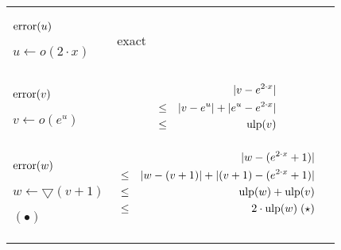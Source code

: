 \documentclass[12pt]{amsart}
\def\minf{\bigtriangledown}
\def\ulp{{\rm ulp}}
\begin{document}
\begin{center}
\begin{tabular}{l l l}

\begin{minipage}{2.5cm}


${\textnormal{error}}(u)$


$u \leftarrow o(2 \cdot x)$


\end{minipage} &
\begin{minipage}{7.5cm}


exact

\end{minipage} &
\begin{minipage}{6cm}
{\hspace{7cm}}
\end{minipage}\\%
\begin{minipage}{2.5cm}
${\textnormal{error}}(v)$


$v \leftarrow o(e^{u}) $

\end{minipage} &
\begin{minipage}{7.5cm}



\begin{eqnarray}\nonumber
  &&|v-e^{2 \cdot x}| \\\nonumber
  &       \leq&  |v - e^{u}| +  |e^{u}  - e^{2 \cdot x}|\\\nonumber
  &       \leq& \ulp(v)
\end{eqnarray}


\end{minipage} &
\begin{minipage}{6cm}


\end{minipage}\\%
\begin{minipage}{2.5cm}
${\textnormal{error}}(w)$


$w \leftarrow \minf(v+1) $

$(\bullet)$
\end{minipage} &
\begin{minipage}{7.5cm}



\begin{eqnarray}\nonumber
  &&|w-(e^{2 \cdot x}+1)| \\\nonumber
  &\leq&  |w - (v+1)|+|(v+1) - (e^{2 \cdot x}+1)|\\\nonumber
  &\leq&  \ulp(w) + \ulp(v)\\\nonumber
  &\leq&  2 \cdot \ulp(w)\;(\star)\\\nonumber
\end{eqnarray}


\end{minipage}
\end{tabular}
\end{center}
\end{document}
